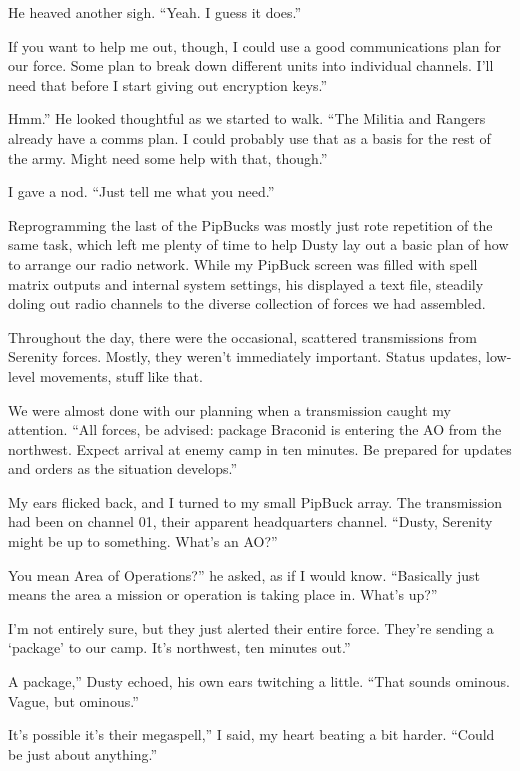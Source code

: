 He heaved another sigh. “Yeah. I guess it does.”

\leavevmode{}If you want to help me out, though, I could use a good communications plan for our force. Some plan to break down different units into individual channels. I’ll need that before I start giving out encryption keys.”

\leavevmode{}Hmm.” He looked thoughtful as we started to walk. “The Militia and Rangers already have a comms plan. I could probably use that as a basis for the rest of the army. Might need some help with that, though.”

I gave a nod. “Just tell me what you need.”

{\br}%
Reprogramming the last of the PipBucks was mostly just rote repetition of the same task, which left me plenty of time to help Dusty lay out a basic plan of how to arrange our radio network. While my PipBuck screen was filled with spell matrix outputs and internal system settings, his displayed a text file, steadily doling out radio channels to the diverse collection of forces we had assembled.

Throughout the day, there were the occasional, scattered transmissions from Serenity forces. Mostly, they weren’t immediately important. Status updates, low-level movements, stuff like that.

We were almost done with our planning when a transmission caught my attention. “All forces, be advised: package Braconid is entering the AO from the northwest. Expect arrival at enemy camp in ten minutes. Be prepared for updates and orders as the situation develops.”

My ears flicked back, and I turned to my small PipBuck array. The transmission had been on channel 01, their apparent headquarters channel. “Dusty, Serenity might be up to something. What’s an AO?”

\leavevmode{}You mean Area of Operations?” he asked, as if I would know. “Basically just means the area a mission or operation is taking place in. What’s up?”

\leavevmode{}I’m not entirely sure, but they just alerted their entire force. They’re sending a ‘package’ to our camp. It’s northwest, ten minutes out.”

\leavevmode{}A package,” Dusty echoed, his own ears twitching a little. “That sounds ominous. Vague, but ominous.”

\leavevmode{}It’s possible it’s their megaspell,” I said, my heart beating a bit harder. “Could be just about anything.”

